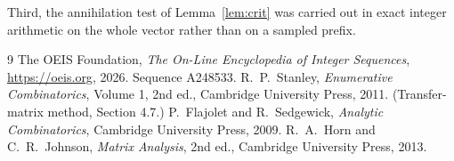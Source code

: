 \documentclass[11pt,a4paper]{article}
\theoremstyle{plain}
\theoremstyle{definition}
\begin{document}
Third, the annihilation test of Lemma~\ref{lem:crit} was carried out in exact integer
arithmetic on the whole vector rather than on a sampled prefix.

\begin{thebibliography}{9}
 The OEIS Foundation, \emph{The On-Line Encyclopedia of Integer
Sequences}, \url{https://oeis.org}, 2026. Sequence A248533.
 R.~P.~Stanley, \emph{Enumerative Combinatorics}, Volume 1, 2nd ed.,
Cambridge University Press, 2011. (Transfer-matrix method, Section 4.7.)
 P.~Flajolet and R.~Sedgewick, \emph{Analytic Combinatorics}, Cambridge
University Press, 2009.
 R.~A.~Horn and C.~R.~Johnson, \emph{Matrix Analysis}, 2nd ed., Cambridge
University Press, 2013.
\end{thebibliography}
\end{document}
